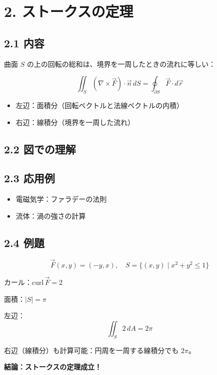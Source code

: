 \documentclass[a4j,11pt]{jsarticle}
\begin{document}
\section*{2. ストークスの定理}

\subsection*{2.1 内容}
曲面 $S$ の上の回転の総和は、境界を一周したときの流れに等しい：

\[
\iint_S (\nabla \times \vec{F}) \cdot \vec{n} \, dS = \oint_{\partial S} \vec{F} \cdot d\vec{r}
\]

\begin{itemize}
  \item 左辺：面積分（回転ベクトルと法線ベクトルの内積）
  \item 右辺：線積分（境界を一周した流れ）
\end{itemize}

\subsection*{2.2 図での理解}

\begin{center}
\end{center}

\subsection*{2.3 応用例}
\begin{itemize}
  \item 電磁気学：ファラデーの法則
  \item 流体：渦の強さの計算
\end{itemize}

\subsection*{2.4 例題}
\[
\vec{F}(x, y) = (-y, x), \quad S = \{(x, y) \mid x^2 + y^2 \leq 1\}
\]

カール：$\mathrm{curl} \, \vec{F} = 2$

面積：$|S| = \pi$

左辺：
\[
\iint_S 2 \, dA = 2\pi
\]

右辺（線積分）も計算可能：円周を一周する線積分でも $2\pi$。

\textbf{結論：ストークスの定理成立！}
\end{document}
